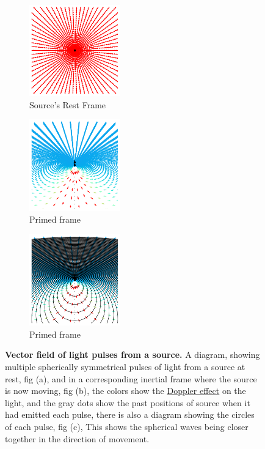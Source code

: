 \begin{figure}[H]
	\begin{subfigure}{.325\textwidth}
		\centering
		\includegraphics[width = 3.95cm]{images/pdf/Field_Rest_Frame.pdf}
		\caption{Source's Rest Frame}
		\label{fig: vector field of light source rest frame}
	\end{subfigure}
	\begin{subfigure}{.325\textwidth}
		\centering
		\includegraphics[width = 3.95cm]{images/pdf/Field_Moving_Frame_Doppler.pdf}
		\caption{Primed frame}
		\label{fig: vector field of light source primed frame}
	\end{subfigure}
	\begin{subfigure}{.325\textwidth}
		\centering
		\includegraphics[width = 3.95cm]{images/pdf/Field_Moving_Frame_Doppler_circles.pdf}
		\caption{Primed frame}
		\label{fig: vector field of light source with rings}
	\end{subfigure}
	\caption{\textbf{Vector field of light pulses from a source.} A diagram, showing multiple spherically symmetrical pulses of light from a source at rest, fig (a), and in a corresponding inertial frame where the source is now moving, fig (b), the colors show the \protect\hyperlink{def-doppler-effect}{Doppler effect} on the light, and the gray dots show the past positions of source when it had emitted each pulse, there is also a diagram showing the circles of each pulse, fig (c), This shows the spherical waves being closer together in the direction of movement.} %
	\label{fig: vector field of light source}
\end{figure}

